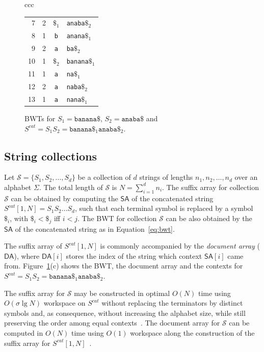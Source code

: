 \documentclass{elsarticle}
\newcommand{\SA}{\ensuremath{\mathsf{SA}}\xspace}
\newcommand{\DA}{\ensuremath{\mathsf{DA}}\xspace}
\renewcommand{\S}{\mathcal{S}}
\renewcommand{\tt}{\texttt}
\begin{document}
\begin{figure}[t]
\begin{center}
\begin{tabular}[t]{ccc}
\begin{tabular}[t]{|r|c|c|l|}
 7  & 2         & \tt{$\$_1$}      & \tt{{ana}ba$\$_2$}   \\
 8  & 1         & \tt{b}           & \tt{{ana}na$\$_1$}  \\
 9  & 2         & \tt{a}           & \tt{{ba}$\$_2$}      \\
 10 & 1         & \tt{$\$_2$}      & \tt{{ba}nana$\$_1$}  \\
 11 & 1         & \tt{a}           & \tt{{na}$\$_1$}    \\
 12 & 2         & \tt{a}           & \tt{{na}ba$\$_2$}      \\
 13 & 1         & \tt{a}           & \tt{{na}na$\$_1$}    \\
\hline
\end{tabular}
\end{tabular}
\end{center}
\caption{BWTs for $S_1=\texttt{banana\$}$, $S_2=\texttt{anaba\$}$ and $S^{cat}=S_1S_2=\tt{banana}\$_1\tt{anaba}\$_2$.}
\label{fig:bwt}
\end{figure}

\subsection{String collections}

Let $\S = \{S_1, S_2, \dots, S_d\}$ be a collection of $d$ strings of
lengths $n_1, n_2, \dots, n_d$ over an alphabet $\Sigma$.  The total
length of $\S$ is $N=\sum_{i=1}^{d}n_i$.  The suffix array for collection
$\S$ can be obtained by computing the \SA of the concatenated string
$S^{cat}[1,N] = S_1 S_2 \ldots S_d$, such that each terminal symbol is
replaced by a symbol $\$_i$, with $\$_i<\$_j$ iff $i<j$.
The BWT for collection $\S$ can be also obtained by the \SA of the
concatenated string as in Equation~\ref{eq:bwt}.

The suffix array of $S^{cat}[1,N]$ is commonly accompanied by the {\em document
array} (\DA), where $\DA[i]$ stores the index of the string which context
$\SA[i]$ came from.
Figure~\ref{fig:bwt}(c) shows the BWT, the document array and the contexts for
$S^{cat}=S_1S_2=\tt{banana}\$_1\tt{anaba}\$_2$.

The suffix array for $\S$ may be constructed in optimal $O(N)$ time
using $O(\sigma \lg N)$ workspace
on $S^{cat}$
without replacing the terminators by distinct symbols
and, as consequence, without increasing the alphabet size,
while still preserving the order
among equal contexts~\cite{Louza2017c}.
The document array for $\S$ can be computed in $O(N)$ time using $O(1)$
workspace along the construction of the suffix array for
$S^{cat}[1,N]$~\cite{Louza2017c}.
\end{document}
